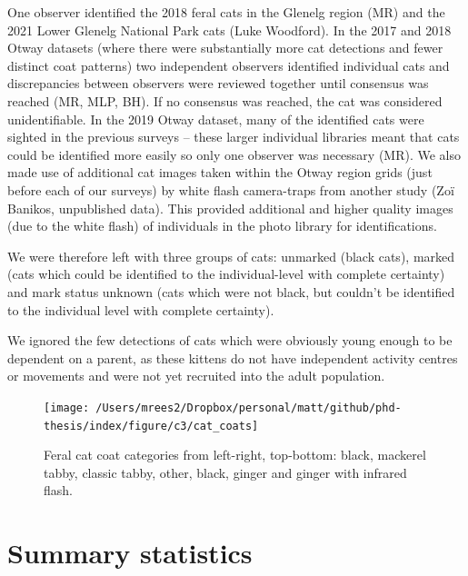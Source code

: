 \documentclass[]{elsarticle} %
\begin{document}
One observer identified the 2018 feral cats in the Glenelg region (MR) and the 2021 Lower Glenelg National Park cats (Luke Woodford). In the 2017 and 2018 Otway datasets (where there were substantially more cat detections and fewer distinct coat patterns) two independent observers identified individual cats and discrepancies between observers were reviewed together until consensus was reached (MR, MLP, BH). If no consensus was reached, the cat was considered unidentifiable. In the 2019 Otway dataset, many of the identified cats were sighted in the previous surveys -- these larger individual libraries meant that cats could be identified more easily so only one observer was necessary (MR). We also made use of additional cat images taken within the Otway region grids (just before each of our surveys) by white flash camera-traps from another study (Zoï Banikos, unpublished data). This provided additional and higher quality images (due to the white flash) of individuals in the photo library for identifications.

We were therefore left with three groups of cats: unmarked (black cats), marked (cats which could be identified to the individual-level with complete certainty) and mark status unknown (cats which were not black, but couldn't be identified to the individual level with complete certainty).

We ignored the few detections of cats which were obviously young enough to be dependent on a parent, as these kittens do not have independent activity centres or movements and were not yet recruited into the adult population.

\newpage

\begin{figure}

{\centering \texttt{[image: /Users/mrees2/Dropbox/personal/matt/github/phd-thesis/index/figure/c3/cat\_coats]} 

}

\caption{Feral cat coat categories from left-right, top-bottom: black, mackerel tabby, classic tabby, other, black, ginger and ginger with infrared flash.}\label{fig:density-cat-photo}
\end{figure}

\newpage

\hypertarget{summary-statistics}{%
\section{Summary statistics}\label{summary-statistics}}
\end{document}

